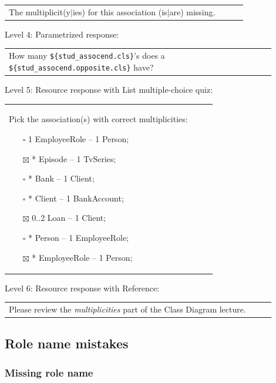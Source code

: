 \begin{tabular}{|p{0.9\linewidth}}
The multiplicit(y$|$ies) for this association (is$|$are) missing.
\end{tabular} \medskip

\noindent Level 4: Parametrized response: \medskip

\begin{tabular}{|p{0.9\linewidth}}
How many \verb|${stud_assocend.cls}|'s does a \verb|${stud_assocend.opposite.cls}| have?
\end{tabular} \medskip

\noindent Level 5: Resource response with List multiple-choice quiz: \medskip

\begin{tabular}{|p{0.9\linewidth}}

Pick the association(s) with correct multiplicities:

\begin{itemize}
    \item[$\square$] 1 EmployeeRole -- 1 Person;
    \item[$\boxtimes$] * Episode -- 1 TvSeries;
    \item[$\square$] * Bank -- 1 Client;
    \item[$\square$] * Client -- 1 BankAccount;
    \item[$\boxtimes$] 0..2 Loan -- 1 Client;
    \item[$\square$] * Person -- 1 EmployeeRole;
    \item[$\boxtimes$] * EmployeeRole -- 1 Person;
\end{itemize}

\end{tabular} \medskip

\noindent Level 6: Resource response with Reference: \medskip

\begin{tabular}{|p{0.9\linewidth}}
Please review the \textit{multiplicities} part of the Class Diagram lecture.
\end{tabular} \medskip


\subsection{Role name mistakes}

\subsubsection{Missing role name}

